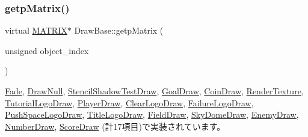 \mbox{\label{class_draw_base_a60fc3148b2679e4ea7723d2af0c37283}} 
\subsubsection{\texorpdfstring{getp\+Matrix()}{getpMatrix()}}
{\footnotesize\ttfamily virtual \mbox{\hyperlink{_vector3_d_8h_a032295cd9fb1b711757c90667278e744}{M\+A\+T\+R\+IX}}$\ast$ Draw\+Base\+::getp\+Matrix (\begin{DoxyParamCaption}\item[{unsigned}]{object\+\_\+index }\end{DoxyParamCaption})\hspace{0.3cm}{\ttfamily [pure virtual]}}



\mbox{\hyperlink{class_fade_a2e41a31f9801476e63d2082804375e96}{Fade}}, \mbox{\hyperlink{class_draw_null_a001901c340671106a33d44b9d4aef4c4}{Draw\+Null}}, \mbox{\hyperlink{class_stencil_shadow_test_draw_a8ab105b75d673adc52698a8401c6525c}{Stencil\+Shadow\+Test\+Draw}}, \mbox{\hyperlink{class_goal_draw_a536a23c043576f9032e6651d7644d038}{Goal\+Draw}}, \mbox{\hyperlink{class_coin_draw_ad8cbbe87f4cf4428214f50492c731f5f}{Coin\+Draw}}, \mbox{\hyperlink{class_render_texture_adafb7e9aeea3c298cbfcc71e35ed9457}{Render\+Texture}}, \mbox{\hyperlink{class_tutorial_logo_draw_aade531190180c385c266f5698f99735d}{Tutorial\+Logo\+Draw}}, \mbox{\hyperlink{class_player_draw_a334e94f368f6bd571da866d69333f313}{Player\+Draw}}, \mbox{\hyperlink{class_clear_logo_draw_abcbd0cd8663e0262bcdd83356516082b}{Clear\+Logo\+Draw}}, \mbox{\hyperlink{class_failure_logo_draw_a6e6fb80dc21af9318d659bc3fa71c0b5}{Failure\+Logo\+Draw}}, \mbox{\hyperlink{class_push_space_logo_draw_a9e0875967651293ef97713477334bc2e}{Push\+Space\+Logo\+Draw}}, \mbox{\hyperlink{class_title_logo_draw_a34fa4366f1ff190a08a36f8e402f6941}{Title\+Logo\+Draw}}, \mbox{\hyperlink{class_field_draw_ad399978201f737f4c0dd2b3990fa6b34}{Field\+Draw}}, \mbox{\hyperlink{class_sky_dome_draw_accbc05d1bbde9ad9d6b7180d91e9ed89}{Sky\+Dome\+Draw}}, \mbox{\hyperlink{class_enemy_draw_afbb8ac19041abda280ece7737103dc66}{Enemy\+Draw}}, \mbox{\hyperlink{class_number_draw_a2ea44b362c3a018faf46905d0f755410}{Number\+Draw}}, \mbox{\hyperlink{class_score_draw_adb995c83624c2eab8b8a15d1182df5b8}{Score\+Draw}} (計17項目)で実装されています。

\mbox{\label{class_draw_base_a76c3b910b495fcf69aacf6164ca90c7d}} 
